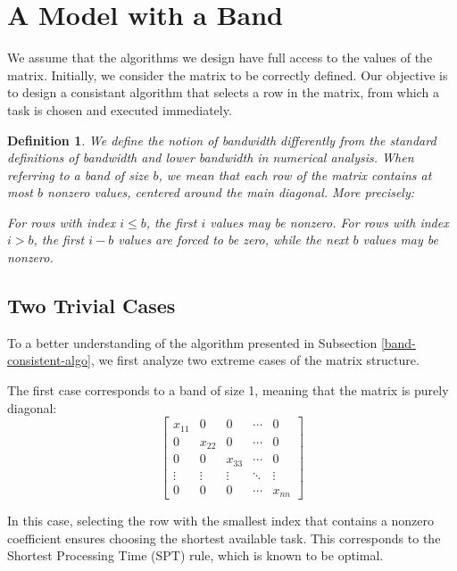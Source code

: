 \documentclass{article}
\newtheorem{definition}{Definition}
\begin{document}
\newpage



\section{A Model with a Band}
We assume that the algorithms we design have full access to the values of the matrix. Initially, we consider the matrix to be correctly defined. Our objective is to design a consistant algorithm that selects a row in the matrix, from which a task is chosen and executed immediately.

\begin{definition}
We define the notion of \emph{bandwidth} differently from the standard definitions of bandwidth and lower bandwidth in numerical analysis. When referring to a band of size $b$, we mean that each row of the matrix contains at most $b$ nonzero values, centered around the main diagonal. More precisely:

For rows with index $i \leq b$, the first $i$ values may be nonzero.
For rows with index $i > b$, the first $i - b$ values are forced to be zero, while the next $b$ values may be nonzero.
\end{definition}

\subsection{Two Trivial Cases}To a better understanding of  the algorithm presented in Subsection \ref{band-consistent-algo}, we first analyze two extreme cases of the matrix structure.

The first case corresponds to a band of size 1, meaning that the matrix is purely diagonal:  
\[
\begin{bmatrix}  
x_{11} & 0 & 0 & \cdots & 0 \\  
0 & x_{22} & 0 & \cdots & 0 \\  
0 & 0 & x_{33} & \cdots & 0 \\  
\vdots & \vdots & \vdots & \ddots & \vdots \\  
0 & 0 & 0 & \cdots & x_{nn}  
\end{bmatrix}  
\]

In this case, selecting the row with the smallest index that contains a nonzero coefficient ensures choosing the shortest available task. This corresponds to the Shortest Processing Time (SPT) rule, which is known to be optimal.
\end{document}
